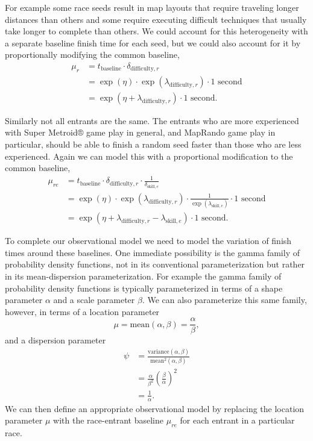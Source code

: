 \documentclass[
  letterpaper,
  DIV=11,
  numbers=noendperiod]{scrartcl}
\begin{document}
For example some race seeds result in map layouts that require traveling
longer distances than others and some require executing difficult
techniques that usually take longer to complete than others. We could
account for this heterogeneity with a separate baseline finish time for
each seed, but we could also account for it by proportionally modifying
the common baseline, \begin{align*}
\mu_{r}
&=
t_{\mathrm{baseline}} \cdot \delta_{\mathrm{difficulty}, r}
\\
&=
\exp(\eta) \cdot \exp( \lambda_{\mathrm{difficulty}, r} )
\cdot 1 \text{ second}
\\
&=
\exp(\eta + \lambda_{\mathrm{difficulty}, r}) \cdot 1 \text{ second}.
\end{align*}

Similarly not all entrants are the same. The entrants who are more
experienced with Super Metroid® game play in general, and MapRando game
play in particular, should be able to finish a random seed faster than
those who are less experienced. Again we can model this with a
proportional modification to the common baseline, \begin{align*}
\mu_{re}
&=
t_{\mathrm{baseline}}
\cdot \delta_{\mathrm{difficulty}, r}
\cdot \frac{1}{\delta_{\mathrm{skill}, e}}
\\
&=
\exp(\eta)
\cdot \exp( \lambda_{\mathrm{difficulty}, r} )
\cdot \frac{1}{\exp( \lambda_{\mathrm{skill}, e} ) }
\cdot 1 \text{ second}
\\
&=
\exp(\eta + \lambda_{\mathrm{difficulty}, r} - \lambda_{\mathrm{skill}, e})
\cdot 1 \text{ second}.
\end{align*}

To complete our observational model we need to model the variation of
finish times around these baselines. One immediate possibility is the
gamma family of probability density functions, not in its conventional
parameterization but rather in its mean-dispersion parameterization. For
example the gamma family of probability density functions is typically
parameterized in terms of a shape parameter \(\alpha\) and a scale
parameter \(\beta\). We can also parameterize this same family, however,
in terms of a location parameter \[
\mu = \text{mean}(\alpha, \beta) = \frac{\alpha}{\beta},
\] and a dispersion parameter \begin{align*}
\psi
&=
\frac{ \text{variance}(\alpha, \beta) }{ \text{mean}^{2}(\alpha, \beta) }
\\
&=
\frac{\alpha}{\beta^{2}} \left( \frac{\beta}{\alpha} \right)^{2}
\\
&=
\frac{1}{\alpha}.
\end{align*} We can then define an appropriate observational model by
replacing the location parameter \(\mu\) with the race-entrant baseline
\(\mu_{re}\) for each entrant in a particular race.
\end{document}
